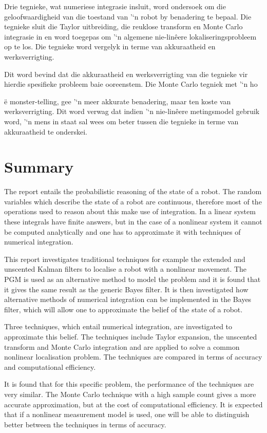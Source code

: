 \documentclass[12pt,oneside,openany,a4paper, %
afrikaans,english,
]{memoir}
\numberwithin{equation}{chapter}
\begin{document}
Drie tegnieke, wat numeriese integrasie insluit, word ondersoek om die geloofwaardigheid van die toestand van '‘n robot by benadering te bepaal.  Die tegnieke sluit die Taylor uitbreiding, die reuklose transform en Monte Carlo integrasie in en word toegepas om '‘n algemene nie-linêere lokaliseringsprobleem op te los. Die tegnieke word vergelyk in terme van akkuraatheid en werksverrigting.

Dit word bevind dat die akkuraatheid en werksverrigting van die tegnieke vir hierdie spesifieke probleem baie ooreenstem. Die Monte Carlo tegniek met '‘n ho{{\"e} monster-telling, gee '‘n meer akkurate benadering, maar ten koste van werksverrigting. Dit word verwag dat indien '‘n nie-linêere metingsmodel gebruik word, '‘n mens in staat sal wees om beter tussen die tegnieke in terme van akkuraatheid te onderskei.
\chapter{Summary}
The report entails the probabilistic reasoning of the state of a robot. The random variables which describe the state of a robot are continuous, therefore most of the operations used to reason about this make use of integration. In a linear system these integrals have finite answers, but in the case of a nonlinear system it cannot be computed analytically and one has to approximate it with techniques of numerical integration.

This report investigates traditional techniques for example the extended and unscented Kalman filters to localise a robot with a nonlinear movement. The PGM is used as an alternative method to model the problem and it is found that it gives the same result as the generic Bayes filter. It is then investigated how alternative methods of numerical integration can be implemented in the Bayes filter, which will allow one to approximate the belief of the state of a robot.

Three techniques, which entail numerical integration, are investigated to approximate this belief. The techniques include Taylor expansion, the unscented transform and Monte Carlo integration and are applied to solve a common nonlinear localisation problem. The techniques are compared in terms of accuracy and computational efficiency.

It is found that for this specific problem, the performance of the techniques are very similar. The Monte Carlo technique with a high sample count gives a more accurate approximation, but at the cost of computational efficiency. It is expected that if a nonlinear measurement model is used, one will be able to distinguish better between the techniques in terms of accuracy.



}
\end{document}
